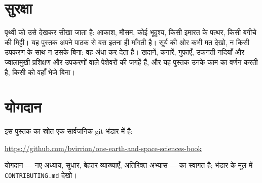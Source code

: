 \section*{सुरक्षा}

पृथ्वी को उसे देखकर सीखा जाता है: आकाश, मौसम, कोई भूदृश्य, किसी इमारत के पत्थर, किसी बगीचे
की मिट्टी। यह पुस्तक अपने पाठक से बस इतना ही माँगती है। सूर्य की ओर कभी मत देखो, न किसी
उपकरण के साथ न उसके बिना: वह अंधा कर देता है। खदानें, कगारें, गुफाएँ, उफनती नदियाँ और
ज्वालामुखी प्रशिक्षण और उपकरणों वाले पेशेवरों की जगहें हैं, और यह पुस्तक उनके काम का वर्णन
करती है, किसी को वहाँ भेजे बिना।

\section*{योगदान}

इस पुस्तक का स्रोत एक सार्वजनिक git भंडार में है:
\begin{center}
\url{https://github.com/bvirrion/one-earth-and-space-sciences-book}
\end{center}
योगदान --- नए अध्याय, सुधार, बेहतर व्याख्याएँ, अतिरिक्त अभ्यास --- का स्वागत है; भंडार के
मूल में \texttt{CONTRIBUTING.md} देखो।
